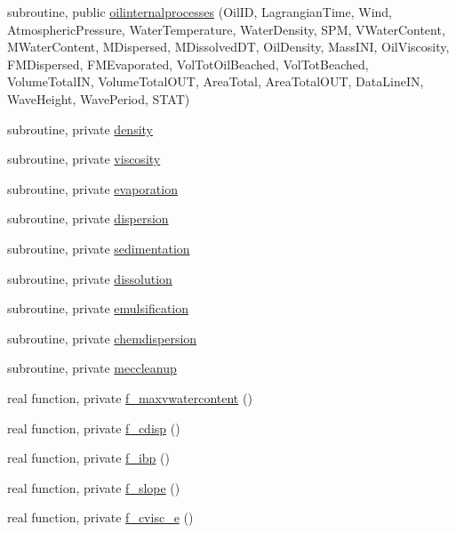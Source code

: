 \begin{DoxyCompactItemize}
subroutine, public \mbox{\hyperlink{namespacemoduleoil_a4b104a789e2f264a4494966c5b9a47fd}{oilinternalprocesses}} (Oil\+ID, Lagrangian\+Time, Wind, Atmospheric\+Pressure, Water\+Temperature, Water\+Density, S\+PM, V\+Water\+Content, M\+Water\+Content, M\+Dispersed, M\+Dissolved\+DT, Oil\+Density, Mass\+I\+NI, Oil\+Viscosity, F\+M\+Dispersed, F\+M\+Evaporated, Vol\+Tot\+Oil\+Beached, Vol\+Tot\+Beached, Volume\+Total\+IN, Volume\+Total\+O\+UT, Area\+Total, Area\+Total\+O\+UT, Data\+Line\+IN, Wave\+Height, Wave\+Period, S\+T\+AT)
\item 
subroutine, private \mbox{\hyperlink{namespacemoduleoil_a9b26683d1a6211ffa180e7c4004596be}{density}}
\item 
subroutine, private \mbox{\hyperlink{namespacemoduleoil_a2aaa2968f62ce93c4b499b8b91d86e75}{viscosity}}
\item 
subroutine, private \mbox{\hyperlink{namespacemoduleoil_a057ec48dbb4ce23ac0814ed1bdc90cc4}{evaporation}}
\item 
subroutine, private \mbox{\hyperlink{namespacemoduleoil_af31781708e110ef05e0de36924287137}{dispersion}}
\item 
subroutine, private \mbox{\hyperlink{namespacemoduleoil_a9a79912febfdb0e994ca0e98a2f342bc}{sedimentation}}
\item 
subroutine, private \mbox{\hyperlink{namespacemoduleoil_a1eb8385a1fb72338d92a438deda6ddb1}{dissolution}}
\item 
subroutine, private \mbox{\hyperlink{namespacemoduleoil_ab22a55bb01358e1000d700bd0b2eebe3}{emulsification}}
\item 
subroutine, private \mbox{\hyperlink{namespacemoduleoil_a0787ef4a57eb2967c2704c9a3fe30dbf}{chemdispersion}}
\item 
subroutine, private \mbox{\hyperlink{namespacemoduleoil_a2e2c8b7a65ec01bb12cb4ae2225bc7e2}{meccleanup}}
\item 
real function, private \mbox{\hyperlink{namespacemoduleoil_ac29f4466dc5d483c853827737c3aa61e}{f\+\_\+maxvwatercontent}} ()
\item 
real function, private \mbox{\hyperlink{namespacemoduleoil_af8b321b109edae35b2e3314b4cae8ee3}{f\+\_\+cdisp}} ()
\item 
real function, private \mbox{\hyperlink{namespacemoduleoil_ad53f4584cf329af849a4ee69c63351c9}{f\+\_\+ibp}} ()
\item 
real function, private \mbox{\hyperlink{namespacemoduleoil_adabc2068ec1e8096747e483ba890f006}{f\+\_\+slope}} ()
\item 
real function, private \mbox{\hyperlink{namespacemoduleoil_a554da2e0cba3e570da78338d2aeef85a}{f\+\_\+cvisc\+\_\+e}} ()

\end{DoxyCompactItemize}

